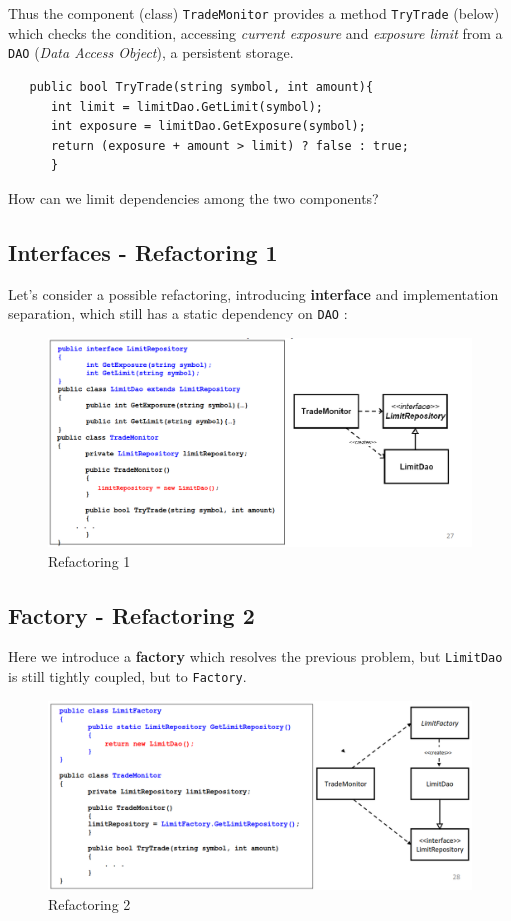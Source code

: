 Thus the component (class) \texttt{TradeMonitor} provides
a method \texttt{TryTrade} (below) which checks the condition,
accessing \textit{current exposure} and \textit{exposure limit} from a \texttt{DAO} (\textit{Data Access Object}), a persistent storage.
\begin{lstlisting}
   public bool TryTrade(string symbol, int amount){
      int limit = limitDao.GetLimit(symbol);
      int exposure = limitDao.GetExposure(symbol);
      return (exposure + amount > limit) ? false : true;
      }
\end{lstlisting}
How can we limit dependencies among the two components?
\subsection{Interfaces - Refactoring 1}
Let's consider a possible refactoring, introducing \textbf{interface} and implementation separation,
which still has a static dependency on \texttt{DAO} :
\begin{figure}[htbp]
   \centering
   \includegraphics{images/trademonitor_ref1.png}
   \caption{Refactoring 1}
   \label{fig:trademonitor_ref1}
\end{figure}

\subsection{Factory - Refactoring 2}
Here we introduce a \textbf{factory} which resolves the previous problem, but \texttt{LimitDao} is still tightly coupled, but to \texttt{Factory}.

\begin{figure}[htbp]
   \centering
   \includegraphics{images/trademonitor_ref2.png}
   \caption{Refactoring 2}
   \label{fig:trademonitor_ref2}
\end{figure}


